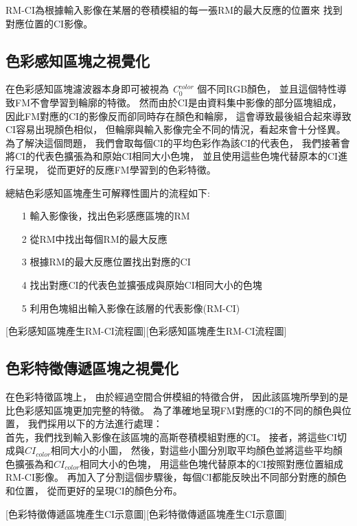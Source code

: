 \documentclass[class=NCU_thesis, crop=false]{standalone}
\begin{document}
	RM-CI為根據輸入影像在某層的卷積模組的每一張RM的最大反應的位置來
	找到對應位置的CI影像。

	\pagebreak
	\subsection{色彩感知區塊之視覺化}
	在色彩感知區塊濾波器本身即可被視為 \textit{C}$^{color}_{0}$ 個不同RGB顏色，
	並且這個特性導致FM不會學習到輪廓的特徵。
	然而由於CI是由資料集中影像的部分區塊組成，
	因此FM對應的CI的影像反而卻同時存在顏色和輪廓，
	這會導致最後組合起來導致CI容易出現顏色相似，
	但輪廓與輸入影像完全不同的情況，看起來會十分怪異。
	為了解決這個問題，
	我們會取每個CI的平均色彩作為該CI的代表色，
	我們接著會將CI的代表色擴張為和原始CI相同大小色塊，
	並且使用這些色塊代替原本的CI進行呈現，
	從而更好的反應FM學習到的色彩特徵。

	總結色彩感知區塊產生可解釋性圖片的流程如下:
	\begin{itemize}
		\item [1]
		輸入影像後，找出色彩感應區塊的RM
		\item [2]
		從RM中找出每個RM的最大反應
		\item [3]
		根據RM的最大反應位置找出對應的CI
		\item [4]
		找出對應CI的代表色並擴張成與原始CI相同大小的色塊
		\item [5]
		利用色塊組出輸入影像在該層的代表影像(RM-CI)
	\end{itemize}

	[色彩感知區塊產生RM-CI流程圖][色彩感知區塊產生RM-CI流程圖]

	\pagebreak

	\subsection{色彩特徵傳遞區塊之視覺化}
	在色彩特徵區塊上，
	由於經過空間合併模組的特徵合併，
	因此該區塊所學到的是比色彩感知區塊更加完整的特徵。
	為了準確地呈現FM對應的CI的不同的顏色與位置，
	我們採用以下的方法進行處理：\\
	首先，我們找到輸入影像在該區塊的高斯卷積模組對應的CI。
	接者，將這些CI切成與$CI_{color}$相同大小的小圖，
	然後，對這些小圖分別取平均顏色並將這些平均顏色擴張為和$CI_{color}$相同大小的色塊，
	用這些色塊代替原本的CI按照對應位置組成RM-CI影像。
	再加入了分割這個步驟後，每個CI都能反映出不同部分對應的顏色和位置，
	從而更好的呈現CI的顏色分布。

	[色彩特徵傳遞區塊產生CI示意圖][色彩特徵傳遞區塊產生CI示意圖]
\end{document}
